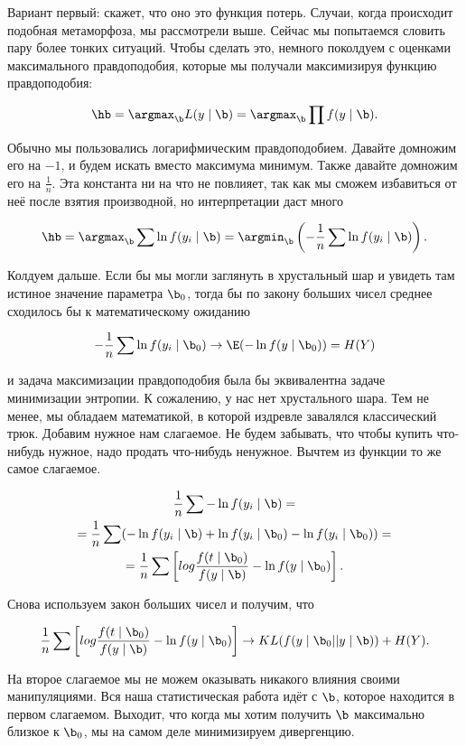 Вариант первый: скажет, что оно это функция потерь. Случаи, когда происходит подобная метаморфоза, мы рассмотрели выше. Сейчас мы попытаемся словить пару более тонких ситуаций.  Чтобы сделать это, немного поколдуем с оценками максимального правдоподобия, которые мы получали максимизируя функцию правдоподобия: 

\[ \hb = \argmax_{\b} L(y \mid \b)  = \argmax_{\b} \prod f(y \mid \b).\]

Обычно мы пользовались логарифмическим правдоподобием. Давайте домножим его на $-1$, и будем искать вместо максимума минимум. Также давайте домножим его на $\frac{1}{n}$. Эта константа ни на что не повлияет, так как мы сможем избавиться от неё после взятия производной, но интерпретации даст много

\[ \hb =\argmax_{\b} \sum \ln f(y_i \mid \b)  =  \argmin_{\b}  \left( -\frac{1}{n} \sum \ln f(y_i \mid \b)  \right).\]

Колдуем дальше. Если бы мы могли заглянуть в хрустальный шар и увидеть там истиное значение параметра $\b_0$, тогда бы по закону больших чисел среднее сходилось бы к математическому ожиданию

\[ -\frac{1}{n} \sum \ln f(y_i \mid \b_0) \to \E(- \ln f(y \mid \b_0)) = H(Y)\]

и задача максимизации правдоподобия была бы эквивалентна задаче минимизации энтропии. К сожалению, у нас нет хрустального шара. Тем не менее, мы обладаем математикой, в которой издревле завалялся классический трюк. Добавим нужное нам слагаемое. Не будем забывать, что чтобы купить что-нибудь нужное, надо продать что-нибудь ненужное. Вычтем из функции то же самое слагаемое. 

\begin{multline*}
\frac{1}{n} \sum -\ln f(y_i \mid \b) = \\ =  \frac{1}{n} \sum (-\ln f(y_i \mid \b) + \ln f(y_i \mid \b_0) - \ln f(y_i \mid \b_0) ) = \\  = \frac{1}{n} \sum \left[log \frac{f(t \mid \b_0)}{f(y \mid \b)} - \ln f(y \mid \b_0) \right].
\end{multline*}

Снова используем закон больших чисел и получим, что 

\begin{multline*}
\frac{1}{n} \sum \left[log \frac{f(t \mid \b_0)}{f(y \mid \b)} - \ln f(y \mid \b_0) \right] \to KL(f(y \mid \b_0 || y \mid \b)) + H(Y).
\end{multline*}

На второе слагаемое мы не можем оказывать никакого влияния своими манипуляциями. Вся наша статистическая работа идёт с $\b$, которое находится в первом слагаемом.  Выходит, что когда мы хотим получить $\b$ максимально близкое к $\b_0$, мы на самом деле минимизируем дивергенцию. 


